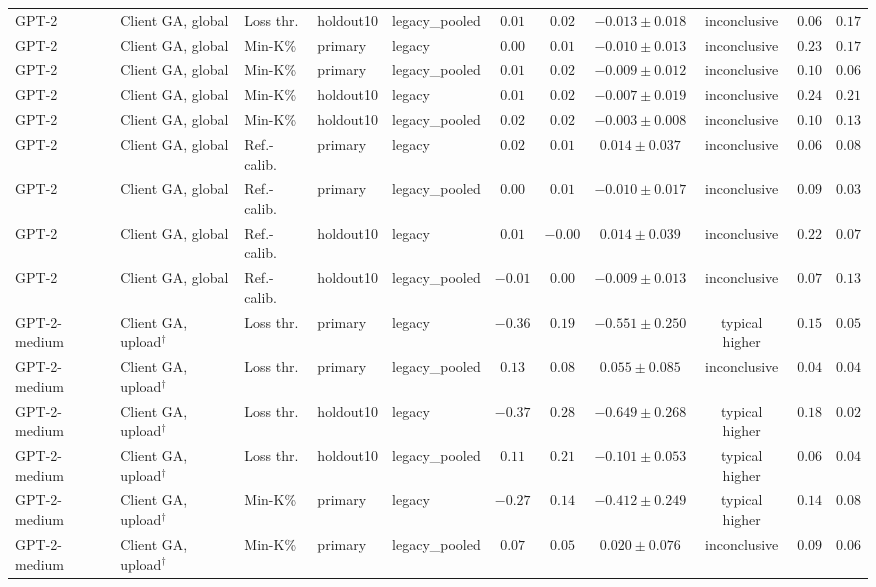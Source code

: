 {\begin{longtable}{@{\extracolsep{\fill}}lllllcccccc@{}}
GPT-2 & Client GA, global & Loss thr. & holdout10 & legacy\_pooled & $0.01$ & $0.02$ & $-0.013 \pm 0.018$ & inconclusive & $0.06$ & $0.17$ \\
GPT-2 & Client GA, global & Min-K\% & primary & legacy & $0.00$ & $0.01$ & $-0.010 \pm 0.013$ & inconclusive & $0.23$ & $0.17$ \\
GPT-2 & Client GA, global & Min-K\% & primary & legacy\_pooled & $0.01$ & $0.02$ & $-0.009 \pm 0.012$ & inconclusive & $0.10$ & $0.06$ \\
GPT-2 & Client GA, global & Min-K\% & holdout10 & legacy & $0.01$ & $0.02$ & $-0.007 \pm 0.019$ & inconclusive & $0.24$ & $0.21$ \\
GPT-2 & Client GA, global & Min-K\% & holdout10 & legacy\_pooled & $0.02$ & $0.02$ & $-0.003 \pm 0.008$ & inconclusive & $0.10$ & $0.13$ \\
GPT-2 & Client GA, global & Ref.-calib. & primary & legacy & $0.02$ & $0.01$ & $0.014 \pm 0.037$ & inconclusive & $0.06$ & $0.08$ \\
GPT-2 & Client GA, global & Ref.-calib. & primary & legacy\_pooled & $0.00$ & $0.01$ & $-0.010 \pm 0.017$ & inconclusive & $0.09$ & $0.03$ \\
GPT-2 & Client GA, global & Ref.-calib. & holdout10 & legacy & $0.01$ & $-0.00$ & $0.014 \pm 0.039$ & inconclusive & $0.22$ & $0.07$ \\
GPT-2 & Client GA, global & Ref.-calib. & holdout10 & legacy\_pooled & $-0.01$ & $0.00$ & $-0.009 \pm 0.013$ & inconclusive & $0.07$ & $0.13$ \\
GPT-2-medium & Client GA, upload$^{\dagger}$ & Loss thr. & primary & legacy & $-0.36$ & $0.19$ & $-0.551 \pm 0.250$ & typical higher & $0.15$ & $0.05$ \\
GPT-2-medium & Client GA, upload$^{\dagger}$ & Loss thr. & primary & legacy\_pooled & $0.13$ & $0.08$ & $0.055 \pm 0.085$ & inconclusive & $0.04$ & $0.04$ \\
GPT-2-medium & Client GA, upload$^{\dagger}$ & Loss thr. & holdout10 & legacy & $-0.37$ & $0.28$ & $-0.649 \pm 0.268$ & typical higher & $0.18$ & $0.02$ \\
GPT-2-medium & Client GA, upload$^{\dagger}$ & Loss thr. & holdout10 & legacy\_pooled & $0.11$ & $0.21$ & $-0.101 \pm 0.053$ & typical higher & $0.06$ & $0.04$ \\
GPT-2-medium & Client GA, upload$^{\dagger}$ & Min-K\% & primary & legacy & $-0.27$ & $0.14$ & $-0.412 \pm 0.249$ & typical higher & $0.14$ & $0.08$ \\
GPT-2-medium & Client GA, upload$^{\dagger}$ & Min-K\% & primary & legacy\_pooled & $0.07$ & $0.05$ & $0.020 \pm 0.076$ & inconclusive & $0.09$ & $0.06$ \\

\end{longtable}}
